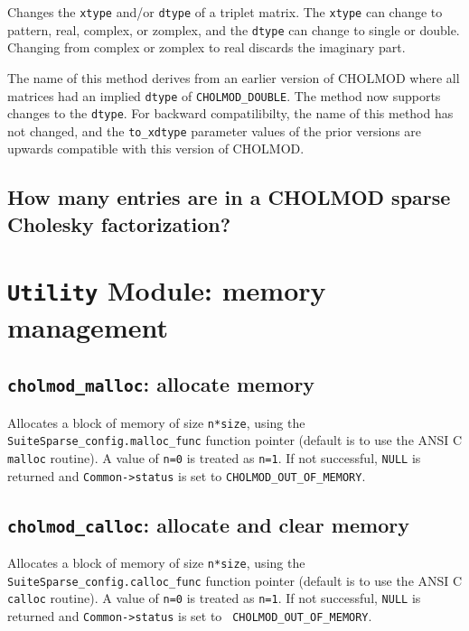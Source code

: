 \documentclass[11pt]{article}
\begin{document}

Changes the {\tt xtype} and/or \verb'dtype' of a triplet matrix.
The \verb'xtype' can change to pattern, real, complex, or zomplex,
and the \verb'dtype' can change to single or double.
Changing from complex or zomplex to real discards the imaginary part.

The name of this method derives from an earlier version of CHOLMOD where all
matrices had an implied \verb'dtype' of \verb'CHOLMOD_DOUBLE'.  The method now
supports changes to the \verb'dtype'.  For backward compatilibilty, the name of
this method has not changed, and the \verb'to_xdtype' parameter values of the
prior versions are upwards compatible with this version of CHOLMOD.

\subsection{How many entries are in a CHOLMOD sparse Cholesky factorization?}

\newpage \section{{\tt Utility} Module: memory management}

\subsection{{\tt cholmod\_malloc}: allocate memory}


Allocates a block of memory of size {\tt n*size}, using the {\tt
SuiteSparse\_config.malloc\_func} function pointer (default is to use the ANSI
C {\tt malloc} routine).  A value of {\tt n=0} is treated as {\tt n=1}.
If not successful, {\tt NULL} is returned and {\tt Common->status} is set to
{\tt CHOLMOD\_OUT\_OF\_MEMORY}.

\subsection{{\tt cholmod\_calloc}: allocate and clear memory}


Allocates a block of memory of size {\tt n*size}, using the {\tt
SuiteSparse\_config.calloc\_func} function pointer (default is to use the ANSI
C {\tt calloc} routine).  A value of {\tt n=0} is treated as {\tt n=1}.  If not
successful, {\tt NULL} is returned and {\tt Common->status} is set to {\tt
CHOLMOD\_OUT\_OF\_MEMORY}.
\end{document}

